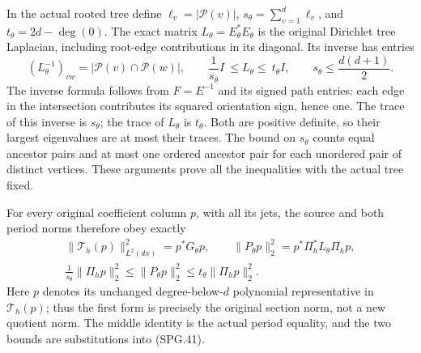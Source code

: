 In the actual rooted tree define
\(\ell_v=|\mathcal P(v)|\),
\(s_\theta=\sum_{v=1}^d\ell_v\), and
\(t_\theta=2d-\deg(0)\). The exact matrix
\(L_\theta=E_\theta^*E_\theta\) is the original Dirichlet
tree Laplacian, including root-edge contributions in its diagonal.
Its inverse has entries
\[
 (L_\theta^{-1})_{vw}=|\mathcal P(v)\cap\mathcal P(w)|,
 \qquad
 \frac1{s_\theta}I\ \le L_\theta\le\ t_\theta I,
 \qquad
 s_\theta\le\frac{d(d+1)}2.
 \tag{SPG.41}\label{GraphV2:eq:spg-exact-tree-metric}
\]
The inverse formula follows from \(F=E^{-1}\) and its signed
path entries: each edge in the intersection contributes its squared
orientation sign, hence one. The trace of this inverse is
\(s_\theta\); the trace of \(L_\theta\) is
\(t_\theta\). Both are positive definite, so their largest
eigenvalues are at most their traces. The bound on \(s_\theta\)
counts equal ancestor pairs and at most one ordered ancestor pair
for each unordered pair of distinct vertices. These arguments prove
all the inequalities with the actual tree fixed.

For every original coefficient column \(p\), with all its jets,
the source and both period norms therefore obey exactly
\[
 \begin{gathered}
 \|\mathcal T_h(p)\|_{L^2(dx)}^2=p^*G_\theta p,\qquad
 \|P_\theta p\|_2^2=p^*\Pi_h^*L_\theta\Pi_h p,\\
 \frac1{s_\theta}\|\Pi_h p\|_2^2
      \le\|P_\theta p\|_2^2
      \le t_\theta\|\Pi_h p\|_2^2.
 \end{gathered}
 \tag{SPG.42}\label{GraphV2:eq:spg-period-source-norms}
\]
Here \(p\) denotes its unchanged degree-below-\(d\) polynomial
representative in \(\mathcal T_h(p)\); thus the first form is
precisely the original section norm, not a new quotient norm.
The middle identity is the actual period equality, and the two
bounds are substitutions into (SPG.41).

